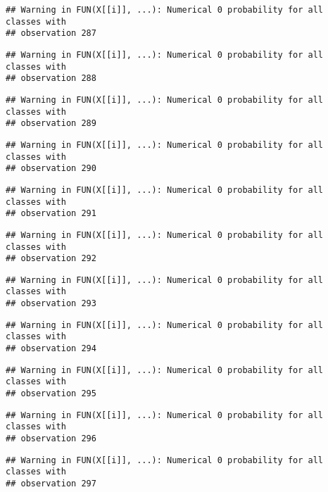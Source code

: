 \documentclass[
]{article}
\begin{document}
\begin{verbatim}
## Warning in FUN(X[[i]], ...): Numerical 0 probability for all classes with
## observation 287
\end{verbatim}

\begin{verbatim}
## Warning in FUN(X[[i]], ...): Numerical 0 probability for all classes with
## observation 288
\end{verbatim}

\begin{verbatim}
## Warning in FUN(X[[i]], ...): Numerical 0 probability for all classes with
## observation 289
\end{verbatim}

\begin{verbatim}
## Warning in FUN(X[[i]], ...): Numerical 0 probability for all classes with
## observation 290
\end{verbatim}

\begin{verbatim}
## Warning in FUN(X[[i]], ...): Numerical 0 probability for all classes with
## observation 291
\end{verbatim}

\begin{verbatim}
## Warning in FUN(X[[i]], ...): Numerical 0 probability for all classes with
## observation 292
\end{verbatim}

\begin{verbatim}
## Warning in FUN(X[[i]], ...): Numerical 0 probability for all classes with
## observation 293
\end{verbatim}

\begin{verbatim}
## Warning in FUN(X[[i]], ...): Numerical 0 probability for all classes with
## observation 294
\end{verbatim}

\begin{verbatim}
## Warning in FUN(X[[i]], ...): Numerical 0 probability for all classes with
## observation 295
\end{verbatim}

\begin{verbatim}
## Warning in FUN(X[[i]], ...): Numerical 0 probability for all classes with
## observation 296
\end{verbatim}

\begin{verbatim}
## Warning in FUN(X[[i]], ...): Numerical 0 probability for all classes with
## observation 297
\end{verbatim}
\end{document}
